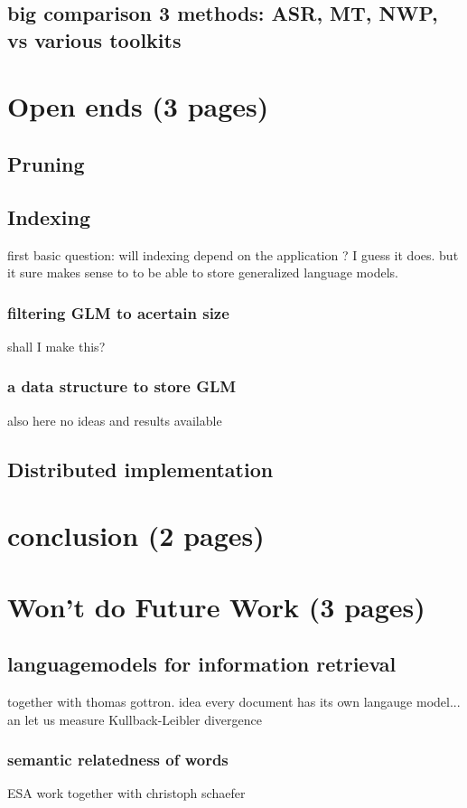 \section{big comparison 3 methods: ASR, MT, NWP, vs various toolkits}


\chapter{Open ends (3 pages)}
\section{Pruning}
\section{Indexing}

first basic question: will indexing depend on the application ? I guess it does. but it sure makes sense to to be able to store generalized language models.
\subsection{filtering GLM to acertain size}
shall I make this?
\subsection{a data structure to store GLM}
also here no ideas and results available

\section{Distributed implementation}
\chapter{conclusion (2 pages)}



\chapter{Won't do Future Work (3 pages)}
\section{languagemodels for information retrieval}
together with thomas gottron. idea every document has its own langauge model... an let us measure Kullback-Leibler divergence
\subsection{semantic relatedness of words}
ESA work together with christoph schaefer

